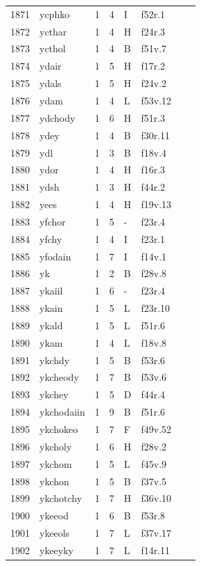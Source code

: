 \documentclass[11pt,a4paper]{article}
\begin{document}
\begin{landscape}
\begin{longtable}{@{}r>{\ttfamily}lrrl>{\ttfamily}l>{\raggedright\arraybackslash}p{80mm}>{\raggedright\arraybackslash}p{36mm}@{}}
1871 & ycphko & 1 & 4 & I & f52r.1 &  & \\
1872 & ycthar & 1 & 4 & H & f24r.3 &  & \\
1873 & ycthol & 1 & 4 & B & f51v.7 &  & \\
1874 & ydair & 1 & 5 & H & f17r.2 &  & \\
1875 & ydals & 1 & 5 & H & f24v.2 &  & \\
1876 & ydam & 1 & 4 & L & f53v.12 &  & \\
1877 & ydchody & 1 & 6 & H & f51r.3 &  & \\
1878 & ydey & 1 & 4 & B & f30r.11 &  & \\
1879 & ydl & 1 & 3 & B & f18v.4 &  & \\
1880 & ydor & 1 & 4 & H & f16r.3 &  & \\
1881 & ydsh & 1 & 3 & H & f44r.2 &  & \\
1882 & yees & 1 & 4 & H & f19v.13 &  & \\
1883 & yfchor & 1 & 5 & - & f23r.4 &  & \\
1884 & yfchy & 1 & 4 & I & f23r.1 &  & \\
1885 & yfodain & 1 & 7 & I & f14v.1 &  & \\
1886 & yk & 1 & 2 & B & f28v.8 &  & \\
1887 & ykaiil & 1 & 6 & - & f23r.4 &  & \\
1888 & ykain & 1 & 5 & L & f23r.10 &  & \\
1889 & ykald & 1 & 5 & L & f51r.6 &  & \\
1890 & ykam & 1 & 4 & L & f18v.8 &  & \\
1891 & ykchdy & 1 & 5 & B & f53r.6 &  & \\
1892 & ykcheody & 1 & 7 & B & f53v.6 &  & \\
1893 & ykchey & 1 & 5 & D & f44r.4 &  & \\
1894 & ykchodaiin & 1 & 9 & B & f51r.6 &  & \\
1895 & ykchokeo & 1 & 7 & F & f49v.52 &  & \\
1896 & ykcholy & 1 & 6 & H & f28v.2 &  & \\
1897 & ykchom & 1 & 5 & L & f45v.9 &  & \\
1898 & ykchon & 1 & 5 & B & f37v.5 &  & \\
1899 & ykchotchy & 1 & 7 & H & f36v.10 &  & \\
1900 & ykeeod & 1 & 6 & B & f53r.8 &  & \\
1901 & ykeeols & 1 & 7 & L & f37v.17 &  & \\
1902 & ykeeyky & 1 & 7 & L & f14r.11 &  & \\

\end{longtable}
\end{landscape}
\end{document}
